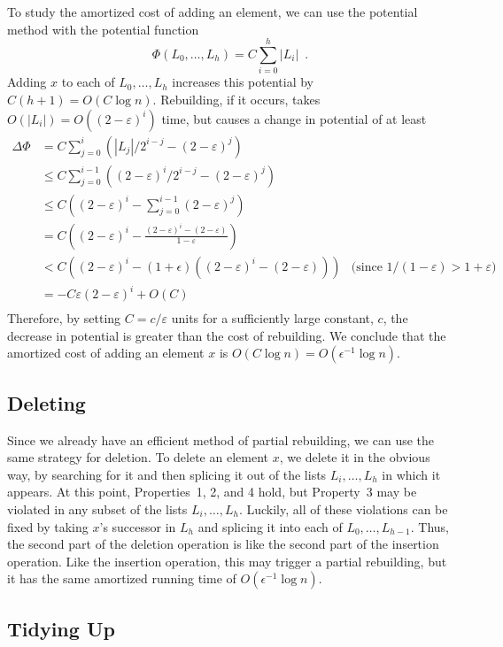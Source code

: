 \documentclass[lotsofwhite]{patmorin}
\newcommand{\eps}{\varepsilon}
\begin{document}
To study the amortized cost of adding an element, we
can use the potential method with the potential function
\[
    \Phi(L_0,\ldots,L_h)=C\sum_{i=0}^h|L_i| \enspace .
\]
Adding $x$ to each of $L_0,\ldots,L_h$ increases this potential by
$C(h+1)=O(C\log n)$.  Rebuilding, if it occurs, takes $O(|L_i|)=O((2-\eps)^i)$
time, but causes a change in potential of at least
\begin{align*}
     \Delta\Phi & = C\sum_{j=0}^i\left(|L_j|/2^{i-j} - (2-\eps)^j\right) \\
          & \le C\sum_{j=0}^{i-1}\left((2-\eps)^i/2^{i-j} - (2-\eps)^j\right) \\
          & \le C\left((2-\eps)^i - \sum_{j=0}^{i-1}(2-\eps)^j\right) \\
          & = C\left((2-\eps)^i - \frac{(2-\eps)^i-(2-\eps)}{1-\eps}\right) \\
          & < C\left((2-\eps)^i - (1+\epsilon)\left((2-\eps)^i-(2-\eps)\right)\right)
           & \text{(since $1/(1-\eps)>1+\eps$)} \\
          & = -C\eps(2-\eps)^i + O(C) \\
\end{align*}
Therefore, by setting $C=c/\eps$ units for a sufficiently large constant,
$c$, the decrease in potential is greater than the cost of rebuilding.
We conclude that the amortized cost of adding an element $x$ is $O(C\log
n)=O(\epsilon^{-1}\log n)$.

\subsection{Deleting}

Since we already have an efficient method of partial rebuilding, we can use the same strategy for deletion. To delete an element $x$, we delete it in the obvious way, by searching for it and then splicing it out of the lists $L_i,\ldots,L_h$ in which it appears.  At this point, Properties~1, 2, and 4 hold, but Property~3 may be violated in any subset of the lists $L_i,\ldots,L_h$.  Luckily, all of these violations can be fixed by taking $x$'s successor in $L_h$ and splicing it into each of $L_0,\ldots,L_{h-1}$.  Thus, the second part of the deletion operation is like the second part of the insertion operation.  Like the insertion operation, this may trigger a partial rebuilding, but it has the same amortized running time of $O(\epsilon^{-1}\log n)$.

\subsection{Tidying Up}
\end{document}
